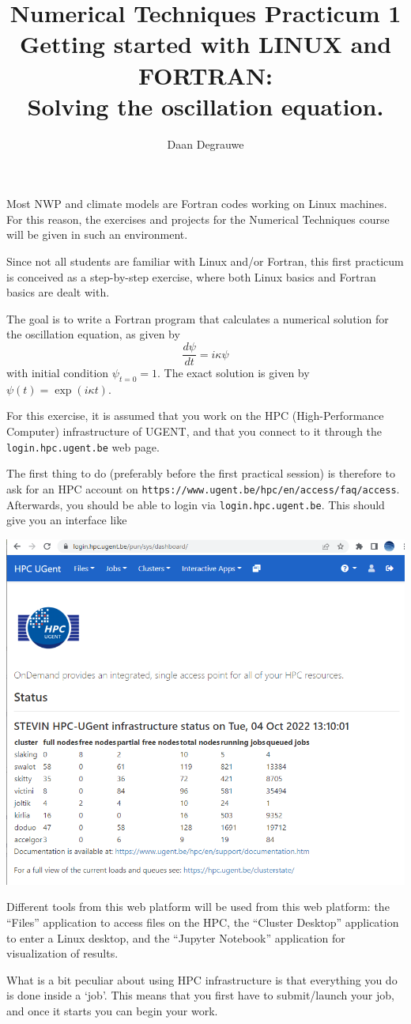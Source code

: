 \documentclass[a4paper]{article}
\title{%
	\bfseries%
	{\large Numerical Techniques Practicum 1}\\[3ex]
	{\Large Getting started with LINUX and FORTRAN:}\\[1ex]
	{\Large Solving the oscillation equation.}
}
\author{Daan Degrauwe}
\begin{document}
%
\maketitle
%
\par
Most NWP and climate models are Fortran codes working on Linux machines. For this reason, the exercises and projects for the Numerical Techniques course will be given in such an environment.
%
\par
Since not all students are familiar with Linux and/or Fortran, this first practicum is conceived as a step-by-step exercise, where both Linux basics and Fortran basics are dealt with.
%
\par
The goal is to write a Fortran program that calculates a numerical solution for the oscillation equation, as given by
%
\begin{equation*}
	\frac{d\psi}{dt}=i\kappa\psi
\end{equation*}
%
with initial condition $\psi_{t=0}=1$. The exact solution is given by $\psi(t)=\exp(i\kappa t)$.
%
\par
For this exercise, it is assumed that you work on the HPC (High-Performance Computer) infrastructure of UGENT, and that you connect to it through the \texttt{login.hpc.ugent.be} web page.
%
\par
The first thing to do (preferably before the first practical session) is therefore to ask for an HPC account on \texttt{https://www.ugent.be/hpc/en/access/faq/access}. Afterwards, you should be able to login via \texttt{login.hpc.ugent.be}. This should give you an interface like
%
\begin{center}
	\includegraphics{login_hpc}
\end{center}
%
\par
Different tools from this web platform will be used from this web platform: the ``Files'' application to access files on the HPC, the ``Cluster Desktop'' application to enter a Linux desktop, and the ``Jupyter Notebook'' application for visualization of results.
%
\par
What is a bit peculiar about using HPC infrastructure is that everything you do is done inside a `job'. This means that you first have to submit/launch your job, and once it starts you can begin your work.
%
\end{document}
